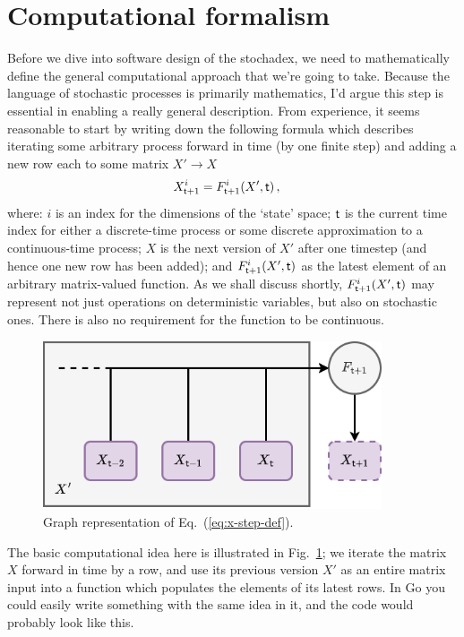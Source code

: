\documentclass{book}
\begin{document}
\section{\sffamily Computational formalism}

Before we dive into software design of the stochadex, we need to mathematically define the general computational approach that we're going to take. Because the language of stochastic processes is primarily mathematics, I'd argue this step is essential in enabling a really general description. From experience, it seems reasonable to start by writing down the following formula which describes iterating some arbitrary process forward in time (by one finite step) and adding a new row each to some matrix $X' \rightarrow X$
\begin{align}
X^{i}_{{\sf t}+1} &= F^{i}_{{\sf t}+1}(X',{\sf t}) \,, \label{eq:x-step-def}
\end{align}
where: $i$ is an index for the dimensions of the `state' space; ${\sf t}$ is the current time index for either a discrete-time process or some discrete approximation to a continuous-time process; $X$ is the next version of $X'$ after one timestep (and hence one new row has been added); and $F^i_{{\sf t}+1}(X',{\sf t})$ as the latest element of an arbitrary matrix-valued function. As we shall discuss shortly, $F^i_{{\sf t}+1}(X',{\sf t})$ may represent not just operations on deterministic variables, but also on stochastic ones. There is also no requirement for the function to be continuous.

\begin{figure}[h]
\centering
\includegraphics[width=10cm]{images/fundamental-loop.drawio.png}
\caption{Graph representation of Eq.~(\ref{eq:x-step-def}).}
\label{fig:fundamental-loop}
\end{figure}

The basic computational idea here is illustrated in Fig.~\ref{fig:fundamental-loop}; we iterate the matrix $X$ forward in time by a row, and use its previous version $X'$ as an entire matrix input into a function which populates the elements of its latest rows. In Go you could easily write something with the same idea in it, and the code would probably look like this.
\end{document}
